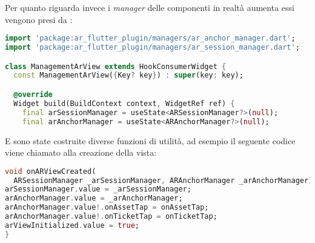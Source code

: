 Per quanto riguarda invece i \textit{manager} delle componenti in realtà aumenta essi vengono presi da \aplug{}:

\begin{lstlisting}[language=dart, label={lst:mobilesyn_managers}, firstnumber=1,caption={mobilesyn \textit{managers}}]
import 'package:ar_flutter_plugin/managers/ar_anchor_manager.dart';
import 'package:ar_flutter_plugin/managers/ar_session_manager.dart';

class ManagementArView extends HookConsumerWidget {
  const ManagementArView({Key? key}) : super(key: key);

  @override
  Widget build(BuildContext context, WidgetRef ref) {
    final arSessionManager = useState<ARSessionManager?>(null);
    final arAnchorManager = useState<ARAnchorManager?>(null);
\end{lstlisting} 

E sono state costruite diverse funzioni di utilità, ad esempio il seguente codice viene chiamato alla creazione della vista:

\begin{lstlisting}[language=dart, label={lst:mobilesyn_onARViewCreated}, firstnumber=1,caption={mobilesyn \textit{on ar view created}}]
void onARViewCreated(
  ARSessionManager _arSessionManager, ARAnchorManager _arAnchorManager) {
arSessionManager.value = _arSessionManager;
arAnchorManager.value = _arAnchorManager;
arAnchorManager.value!.onAssetTap = onAssetTap;
arAnchorManager.value!.onTicketTap = onTicketTap;
arViewInitialized.value = true;
}
\end{lstlisting} 

